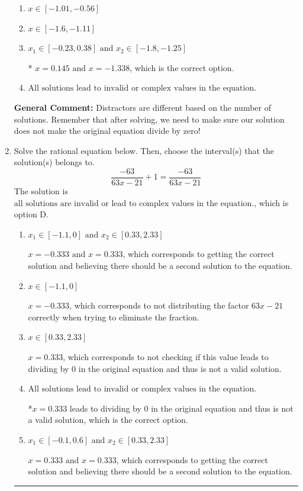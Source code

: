 \documentclass{extbook}[14pt]
\newcommand{\litem}[1]{\item #1

\rule{\textwidth}{0.4pt}}
\begin{document}
\begin{enumerate}
{\begin{enumerate}[label=\Alph*.]
\item \( x \in [-1.01,-0.56] \)


\item \( x \in [-1.6,-1.11] \)


\item \( x_1 \in [-0.23, 0.38] \text{ and } x_2 \in [-1.8,-1.25] \)

* $x = 0.145 \text{ and } x = -1.338$, which is the correct option.
\item \( \text{All solutions lead to invalid or complex values in the equation.} \)


\end{enumerate}

\textbf{General Comment:} Distractors are different based on the number of solutions. Remember that after solving, we need to make sure our solution does not make the original equation divide by zero!
}
\litem{
Solve the rational equation below. Then, choose the interval(s) that the solution(s) belongs to.
\[ \frac{-63}{63x -21} + 1 = \frac{-63}{63x -21} \]The solution is \( \text{all solutions are invalid or lead to complex values in the equation.} \), which is option D.\begin{enumerate}[label=\Alph*.]
\item \( x_1 \in [-1.1, 0] \text{ and } x_2 \in [0.33,2.33] \)

$x = -0.333 \text{ and } x = 0.333$, which corresponds to getting the correct solution and believing there should be a second solution to the equation.
\item \( x \in [-1.1,0] \)

$x = -0.333$, which corresponds to not distributing the factor $63x -21$ correctly when trying to eliminate the fraction.
\item \( x \in [0.33,2.33] \)

$x = 0.333$, which corresponds to not checking if this value leads to dividing by 0 in the original equation and thus is not a valid solution.
\item \( \text{All solutions lead to invalid or complex values in the equation.} \)

*$x = 0.333$ leads to dividing by 0 in the original equation and thus is not a valid solution, which is the correct option.
\item \( x_1 \in [-0.1, 0.6] \text{ and } x_2 \in [0.33,2.33] \)

$x = 0.333 \text{ and } x = 0.333$, which corresponds to getting the correct solution and believing there should be a second solution to the equation.
\end{enumerate}

}
\end{enumerate}
\end{document}
